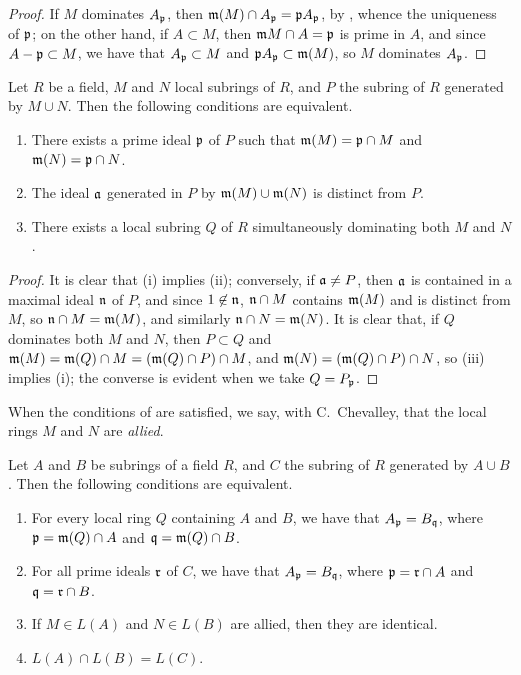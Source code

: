 \begin{proof}
\label{proof-1.8.1.3}
If $M$ dominates $A_\mathfrak{p}$, then $\mathfrak{m}(M)\cap A_\mathfrak{p}=\mathfrak{p}A_\mathfrak{p}$, by , whence the uniqueness of $\mathfrak{p}$;
on the other hand, if $A\subset M$, then $\mathfrak{m}M\cap A=\mathfrak{p}$ is prime in $A$, and since $A-\mathfrak{p}\subset M$, we have that $A_\mathfrak{p}\subset M$ and $\mathfrak{p}A_\mathfrak{p}\subset\mathfrak{m}(M)$, so $M$ dominates $A_\mathfrak{p}$.
\end{proof}

\begin{lem}[8.1.4]
\label{1.8.1.4}
Let $R$ be a field, $M$ and $N$ local subrings of $R$, and $P$ the subring of $R$ generated by $M\cup N$.
Then the following conditions are equivalent.
\begin{enumerate}[label=\emph{(\roman*)}]
  \item There exists a prime ideal $\mathfrak{p}$ of $P$ such that $\mathfrak{m}(M)=\mathfrak{p}\cap M$ and $\mathfrak{m}(N)=\mathfrak{p}\cap N$.
  \item The ideal $\mathfrak{a}$ generated in $P$ by $\mathfrak{m}(M)\cup\mathfrak{m}(N)$ is distinct from $P$.
  \item There exists a local subring $Q$ of $R$ simultaneously dominating both $M$ and $N$.
\end{enumerate}
\end{lem}

\begin{proof}
\label{proof-1.8.1.4}
It is clear that (i) implies (ii);
conversely, if $\mathfrak{a}\neq P$, then $\mathfrak{a}$ is contained in a maximal ideal $\mathfrak{n}$ of $P$, and since $1\not\in\mathfrak{n}$, $\mathfrak{n}\cap M$ contains $\mathfrak{m}(M)$ and is distinct from $M$, so $\mathfrak{n}\cap M=\mathfrak{m}(M)$, and similarly $\mathfrak{n}\cap N=\mathfrak{m}(N)$.
It is clear that, if $Q$ dominates both $M$ and $N$, then $P\subset Q$ and $\mathfrak{m}(M)=\mathfrak{m}(Q)\cap M=(\mathfrak{m}(Q)\cap P)\cap M$, and $\mathfrak{m}(N)=(\mathfrak{m}(Q)\cap P)\cap N$, so (iii) implies (i);
the converse is evident when we take $Q=P_\mathfrak{p}$.
\end{proof}

When the conditions of  are satisfied, we say, with C.~Chevalley, that the local rings $M$ and $N$ are \emph{allied}.

\begin{prop}[8.1.5]
\label{1.8.1.5}
Let $A$ and $B$ be subrings of a field $R$, and $C$ the subring of $R$ generated by $A\cup B$.
Then the following conditions are equivalent.
\begin{enumerate}[label=\emph{(\roman*)}]
  \item For every local ring $Q$ containing $A$ and $B$, we have that $A_\mathfrak{p}=B_\mathfrak{q}$, where $\mathfrak{p}=\mathfrak{m}(Q)\cap A$ and $\mathfrak{q}=\mathfrak{m}(Q)\cap B$.
  \item For all prime ideals $\mathfrak{r}$ of $C$, we have that $A_\mathfrak{p}=B_\mathfrak{q}$, where $\mathfrak{p}=\mathfrak{r}\cap A$ and $\mathfrak{q}=\mathfrak{r}\cap B$.
  \item If $M\in L(A)$ and $N\in L(B)$ are allied, then they are identical.
  \item $L(A)\cap L(B)=L(C)$.
\end{enumerate}
\end{prop}

